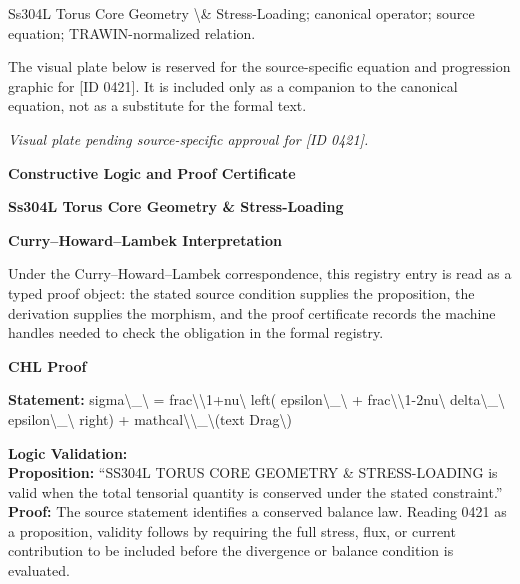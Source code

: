 Ss304L Torus Core Geometry \textbackslash{}\& Stress-Loading; canonical operator; source equation; TRAWIN-normalized relation.
\endgroup

\begingroup\footnotesize\sloppy
The visual plate below is reserved for the source-specific equation and progression graphic for [ID 0421]. It is included only as a companion to the canonical equation, not as a substitute for the formal text.
\par\endgroup
\begingroup\footnotesize\itshape
Visual plate pending source-specific approval for [ID 0421].
\par\endgroup

\clearpage
\begingroup\tzpsupportsetup
\noindent\textbf{\fontsize{10.8pt}{12.8pt}\selectfont [ID 0421] Constructive Logic and Proof Certificate}\par
\noindent\textbf{\fontsize{10pt}{12pt}\selectfont Ss304L Torus Core Geometry \& Stress-Loading}\par
\vspace{0.45em}
\begingroup
\footnotesize
\setlength{\parskip}{0.22em}
\setlength{\parindent}{0pt}
\noindent\textbf{Curry--Howard--Lambek Interpretation}\par
Under the Curry--Howard--Lambek correspondence, this registry entry is read as a typed proof
object: the stated source condition supplies the proposition, the derivation supplies the
morphism, and the proof certificate records the machine handles needed to check the obligation
in the formal registry.

\vspace{0.45em}
\noindent\textbf{CHL Proof}\par
\textbf{Statement:} sigma\textbackslash{}\_\textbackslash{} = frac\textbackslash{}\textbackslash{}1+nu\textbackslash{} left( epsilon\textbackslash{}\_\textbackslash{} + frac\textbackslash{}\textbackslash{}1-2nu\textbackslash{} delta\textbackslash{}\_\textbackslash{} epsilon\textbackslash{}\_\textbackslash{} right) +
mathcal\textbackslash{}\textbackslash{}\_\textbackslash{}(text Drag\textbackslash{})

\textbf{Logic Validation:}\\
\textbf{Proposition:} ``SS304L TORUS CORE GEOMETRY \& STRESS-LOADING is valid when the total tensorial quantity
is conserved under the stated constraint.''\\
\textbf{Proof:} The source statement identifies a conserved balance law. Reading 0421 as a proposition,
validity follows by requiring the full stress, flux, or current contribution to be
included before the divergence or balance condition is evaluated.

